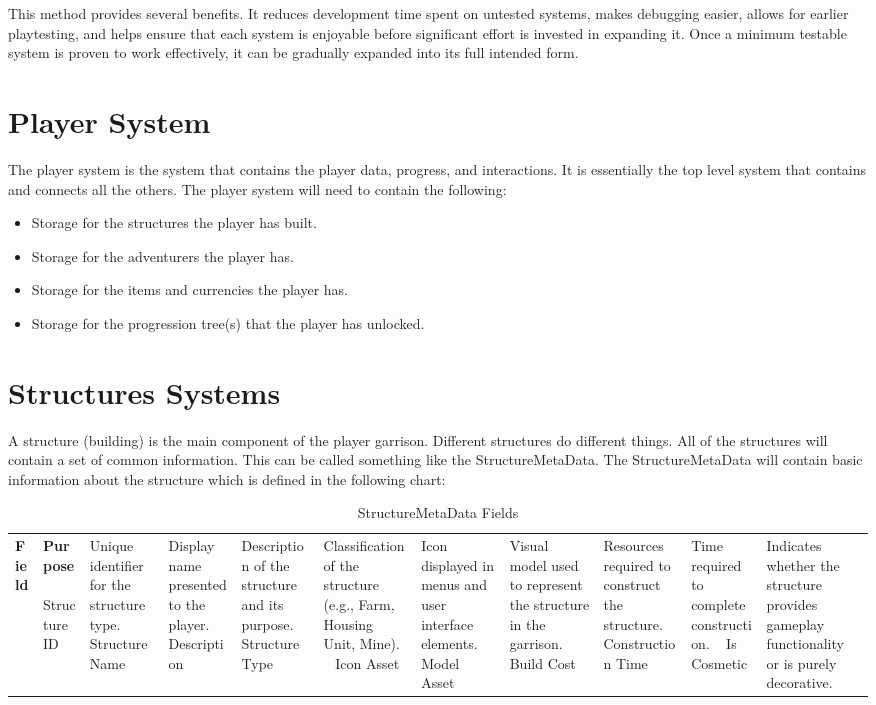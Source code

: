 This method provides several benefits. It reduces development time spent on untested systems, makes debugging easier, allows for earlier playtesting, and helps ensure that each system is enjoyable before significant effort is invested in expanding it. Once a minimum testable system is proven to work effectively, it can be gradually expanded into its full intended form.




\section{Player System}\label{Player System}

The player system is the system that contains the player data, progress, and interactions. It is essentially the top level system that contains and connects all the others. The player system will need to contain the following:

\begin{itemize}
  \item Storage for the structures the player has built.
  \item Storage for the adventurers the player has.
  \item Storage for the items and currencies the player has.
  \item Storage for the progression tree(s) that the player has unlocked.
\end{itemize}







\section{Structures Systems}\label{Structures Systems}

A structure (building) is the main component of the player garrison. Different structures do different things. All of the structures will contain a set of common information. This can be called something like the StructureMetaData. The StructureMetaData will contain basic information about the structure which is defined in the following chart:

\begin{table}[htbp]
\centering
\caption{StructureMetaData Fields}
\label{tab}
\begin{tabular}{|p{4cm}|p{9cm}|}
\hline
\textbf{Field} & \textbf{Purpose} \
\hline
Structure ID & Unique identifier for the structure type. \
\hline
Structure Name & Display name presented to the player. \
\hline
Description & Description of the structure and its purpose. \
\hline
Structure Type & Classification of the structure (e.g., Farm, Housing Unit, Mine). \
\hline
Icon Asset & Icon displayed in menus and user interface elements. \
\hline
Model Asset & Visual model used to represent the structure in the garrison. \
\hline
Build Cost & Resources required to construct the structure. \
\hline
Construction Time & Time required to complete construction. \
\hline
Is Cosmetic & Indicates whether the structure provides gameplay functionality or is purely decorative. \
\hline
\end{tabular}
\end{table}

